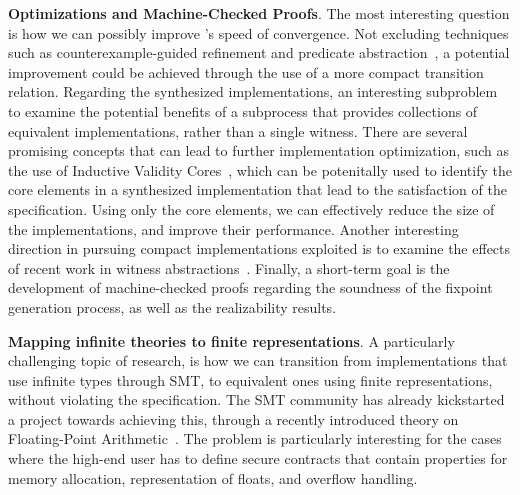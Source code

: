 \textbf{Optimizations and Machine-Checked Proofs}. The most interesting question is how we can possibly improve \jsynvg's
speed of convergence. Not excluding techniques such as counterexample-guided
refinement and predicate abstraction~\cite{walker2014predicate}, a potential
improvement could be achieved through the use of a more compact transition
relation. Regarding the synthesized implementations, an interesting subproblem to examine the potential benefits of a subprocess that provides collections of equivalent implementations, rather than
a single witness. There are several promising concepts that can lead to further implementation optimization, such as the use of Inductive Validity Cores~\cite{Ghass16}, which can be potenitally used to identify the core elements in a synthesized implementation that lead to the satisfaction of the specification. Using only the core elements, we can effectively reduce the size of the implementations, and improve their performance. Another interesting direction in pursuing compact implementations exploited is to examine the effects of recent work in witness abstractions~\cite{jakobs2017compact}. Finally, a short-term goal is the development of machine-checked
proofs regarding the soundness of the fixpoint generation process, as well as the realizability results.

\iffalse
\textbf{Test case generation}. \aeval's effectiveness in providing witnesses to the
satisfiability of $\forall\exists$-formulas can be also exploited in terms of the
tool providing concrete counterexamples to a subset of unrealizable contracts that relate to formula $\phi' \gets \forall s. \ (F(s) \Rightarrow \exists i. A(s,i) \land \lnot Q(s,i))'$ being valid (Algorithm~\ref{alg:synthesis}, Line 16). 
In this particular case, if $\phi'$ is a valid formula, it is possible a witness that can be essentially used as a test case to demonstrate the specification's unrealizability. The witness contains
certain assignments to input variables, for which the condition of viability does not hold, for any state. In conjunction with the potential capabilities of generating collections of equivalent implementations, this problem may lead to the creation of an elegant process that constructs test suites against the contract's realizability. Such a test suite can then be used as a complementary collection to testing procedures that take place towards the end of the system's development.    
\fi
\textbf{Mapping infinite theories to finite representations}. A particularly challenging topic of research, is how we can transition from implementations that use
infinite types through SMT, to equivalent ones using finite representations, without violating the specification. The SMT community has already kickstarted a project towards achieving this, through a recently introduced theory on Floating-Point Arithmetic~\cite{brain2015automatable}. The problem is particularly interesting for the cases where the high-end user has to define secure contracts that contain properties for memory allocation, representation of floats, and overflow handling.
\fi